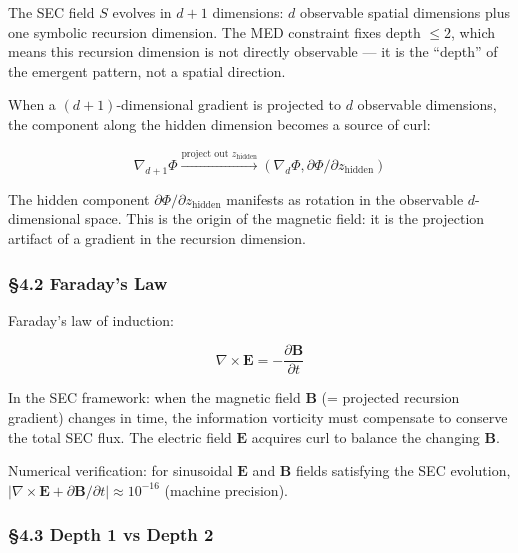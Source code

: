 \documentclass[
  11pt,
  a4paper]{article}
\begin{document}
The SEC field \(S\) evolves in \(d + 1\) dimensions: \(d\) observable
spatial dimensions plus one symbolic recursion dimension. The MED
constraint fixes depth \(\leq 2\), which means this recursion dimension
is not directly observable --- it is the ``depth'' of the emergent
pattern, not a spatial direction.

When a \((d+1)\)-dimensional gradient is projected to \(d\) observable
dimensions, the component along the hidden dimension becomes a source of
curl:

\[\nabla_{d+1}\Phi \xrightarrow{\text{project out } z_\text{hidden}} (\nabla_d \Phi, \partial\Phi/\partial z_\text{hidden})\]

The hidden component \(\partial\Phi/\partial z_\text{hidden}\) manifests
as rotation in the observable \(d\)-dimensional space. This is the
origin of the magnetic field: it is the projection artifact of a
gradient in the recursion dimension.

\subsubsection{§4.2 Faraday's Law}\label{faradays-law}

Faraday's law of induction:

\[\nabla \times \mathbf{E} = -\frac{\partial \mathbf{B}}{\partial t}\]

In the SEC framework: when the magnetic field \(\mathbf{B}\) (=
projected recursion gradient) changes in time, the information vorticity
must compensate to conserve the total SEC flux. The electric field
\(\mathbf{E}\) acquires curl to balance the changing \(\mathbf{B}\).

Numerical verification: for sinusoidal \(\mathbf{E}\) and \(\mathbf{B}\)
fields satisfying the SEC evolution,
\(|\nabla \times \mathbf{E} + \partial\mathbf{B}/\partial t| \approx 10^{-16}\)
(machine precision).

\subsubsection{§4.3 Depth 1 vs Depth 2}\label{depth-1-vs-depth-2}
\end{document}
